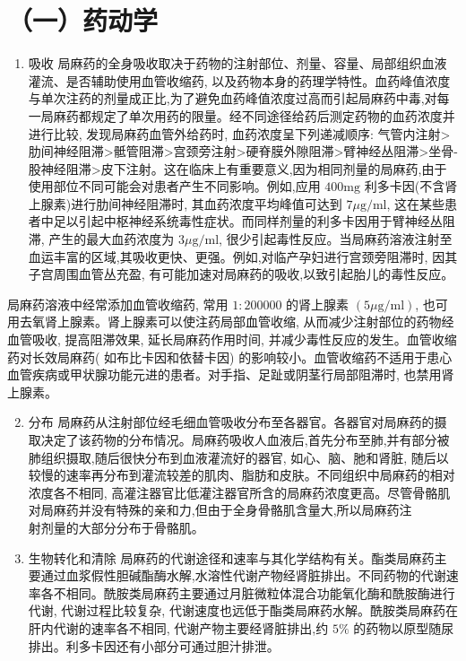 \documentclass[10pt]{article}
\begin{document}
\section*{（一）药动学}
\begin{enumerate}
  \item 吸收 局麻药的全身吸收取决于药物的注射部位、剂量、容量、局部组织血液灌流、是否辅助使用血管收缩药, 以及药物本身的药理学特性。血药峰值浓度与单次注药的剂量成正比,为了避免血药峰值浓度过高而引起局麻药中毒,对每一局麻药都规定了单次用药的限量。经不同途径给药后测定药物的血药浓度并进行比较, 发现局麻药血管外给药时, 血药浓度呈下列递减顺序: 气管内注射>肋间神经阻滞>骶管阻滞>宫颈旁注射>硬脊膜外隙阻滞>臂神经丛阻滞>坐骨-股神经阻滞>皮下注射。这在临床上有重要意义,因为相同剂量的局麻药,由于使用部位不同可能会对患者产生不同影响。例如,应用 $400 \mathrm{mg}$ 利多卡因(不含肾上腺素)进行肋间神经阻滞时, 其血药浓度平均峰值可达到 $7 \mu \mathrm{g} / \mathrm{ml}$, 这在某些患者中足以引起中枢神经系统毒性症状。而同样剂量的利多卡因用于臂神经丛阻滞, 产生的最大血药浓度为 $3 \mu \mathrm{g} / \mathrm{ml}$, 很少引起毒性反应。当局麻药溶液注射至血运丰富的区域,其吸收更快、更强。例如,对临产孕妇进行宫颈旁阻滞时, 因其子宫周围血管丛充盈, 有可能加速对局麻药的吸收,以致引起胎儿的毒性反应。
\end{enumerate}

局麻药溶液中经常添加血管收缩药, 常用 $1: 200000$ 的肾上腺素 $(5 \mu \mathrm{g} / \mathrm{ml})$, 也可用去氧肾上腺素。肾上腺素可以使注药局部血管收缩, 从而减少注射部位的药物经血管吸收, 提高阻滞效果, 延长局麻药作用时间, 并减少毒性反应的发生。血管收缩药对长效局麻药( 如布比卡因和依替卡因) 的影响较小。血管收缩药不适用于患心血管疾病或甲状腺功能元进的患者。对手指、足趾或阴茎行局部阻滞时, 也禁用肾上腺素。

\begin{enumerate}
  \setcounter{enumi}{1}
  \item 分布 局麻药从注射部位经毛细血管吸收分布至各器官。各器官对局麻药的摄取决定了该药物的分布情况。局麻药吸收人血液后,首先分布至肺,并有部分被肺组织摄取,随后很快分布到血液灌流好的器官, 如心、脑、肔和肾脏, 随后以较慢的速率再分布到灌流较差的肌肉、脂肪和皮肤。不同组织中局麻药的相对浓度各不相同, 高灌注器官比低灌注器官所含的局麻药浓度更高。尽管骨骼肌对局麻药并没有特殊的亲和力,但由于全身骨骼肌含量大,所以局麻药注\\
射剂量的大部分分布于骨骼肌。

  \item 生物转化和清除 局麻药的代谢途径和速率与其化学结构有关。酯类局麻药主要通过血浆假性胆碱酯酶水解,水溶性代谢产物经肾脏排出。不同药物的代谢速率各不相同。酰胺类局麻药主要通过月脏微粒体混合功能氧化酶和酰胺酶进行代谢, 代谢过程比较复杂, 代谢速度也远低于酯类局麻药水解。酰胺类局麻药在肝内代谢的速率各不相同, 代谢产物主要经肾脏排出,约 $5 \%$ 的药物以原型随尿排出。利多卡因还有小部分可通过胆汁排泄。

\end{enumerate}
\end{document}
